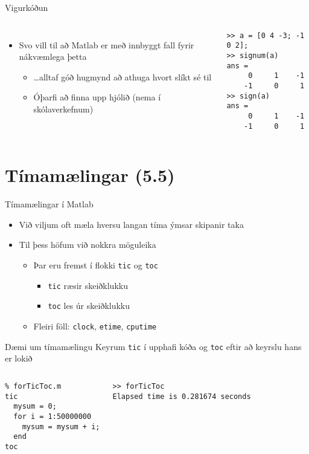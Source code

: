 \documentclass{beamer}
\begin{document}
\begin{frame}[fragile]{Vigurkóðun}
\begin{columns}
\begin{itemize}
 \item Svo vill til að Matlab er með innbyggt fall fyrir nákvæmlega þetta
 \begin{itemize}
  \item \ldots alltaf góð hugmynd að athuga hvort slíkt sé til
  \item Óþarfi að finna upp hjólið (nema í skólaverkefnum)
 \end{itemize}
\end{itemize}
\begin{verbatim}
>> a = [0 4 -3; -1 0 2];
>> signum(a)
ans =
     0     1    -1
    -1     0     1
>> sign(a)
ans =
     0     1    -1
    -1     0     1
\end{verbatim}
\end{columns}
\end{frame}

\section{Tímamælingar (5.5)}

\begin{frame}{Tímamælingar í Matlab}
\begin{itemize}
 \item Við viljum oft mæla hversu langan tíma ýmsar skipanir taka 
 \item Til þess höfum við nokkra möguleika
 \begin{itemize}
  \item Þar eru fremst í flokki \texttt{tic} og \texttt{toc}
  \begin{itemize}
   \item \texttt{tic} ræsir skeiðklukku
   \item \texttt{toc} les úr skeiðklukku
  \end{itemize}
  \item Fleiri föll: \texttt{clock}, \texttt{etime}, \texttt{cputime}
 \end{itemize}
\end{itemize}
\end{frame}

\begin{frame}[fragile]{Dæmi um tímamælingu}
\vspace{\baselineskip}
Keyrum \texttt{tic} í upphafi kóða og \texttt{toc} eftir að keyrslu hans er lokið
\begin{columns}
\begin{verbatim}
% forTicToc.m
tic
  mysum = 0;
  for i = 1:50000000
    mysum = mysum + i;
  end
toc
\end{verbatim}
\begin{verbatim}
>> forTicToc
Elapsed time is 0.281674 seconds
\end{verbatim}
\end{columns}
\end{frame}
\end{document}
